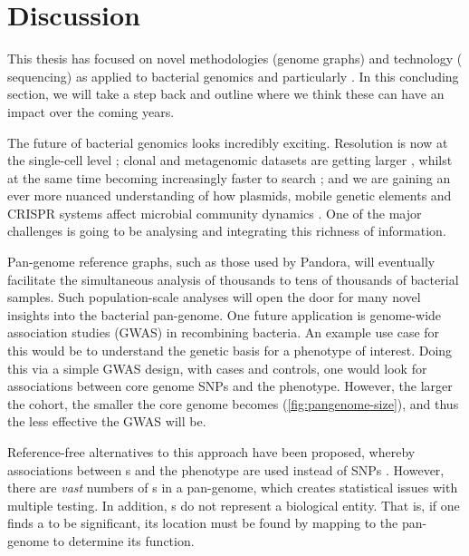 \chapter*{Discussion}
 
\label{chap:conclusion}

This thesis has focused on novel methodologies (genome graphs) and technology (\ont{} sequencing) as applied to bacterial genomics and particularly \mtb{}. In this concluding section, we will take a step back and outline where we think these can have an impact over the coming years.

The future of bacterial genomics looks incredibly exciting. Resolution is now at the single-cell level \cite{Woyke2017, Blattman2020}; clonal and metagenomic datasets are getting larger \cite{Blackwell2021}, whilst at the same time becoming increasingly faster to search \cite{Bradley2019Ultrafast}; and we are gaining an ever more nuanced understanding of how plasmids, mobile genetic elements and CRISPR systems affect microbial community dynamics \cite{MartnezArbas2020,Len2021}. One of the major challenges is going to be analysing and integrating this richness of information.

\hspace{0.5cm}

\noindent
Pan-genome reference graphs, such as those used by Pandora, will eventually facilitate the simultaneous analysis of thousands to tens of thousands of bacterial samples. Such population-scale analyses will open the door for many novel insights into the bacterial pan-genome. One future application is genome-wide association studies (GWAS) in recombining bacteria. An example use case for this would be to understand the genetic basis for a phenotype of interest. Doing this via a simple GWAS design, with cases and controls, one would look for associations between core genome SNPs and the phenotype. However, the larger the cohort, the smaller the core genome becomes (\autoref{fig:pangenome-size}), and thus the less effective the GWAS will be. 

Reference-free alternatives to this approach have been proposed, whereby associations between \kmer{}s and the phenotype are used instead of SNPs \cite{Jaillard2018,Lees2016Sequence}. However, there are \emph{vast} numbers of \kmer{}s in a pan-genome, which creates statistical issues with multiple testing. In addition, \kmer{}s do not represent a biological entity. That is, if one finds a \kmer{} to be significant, its location must be found by mapping to the pan-genome to determine its function.

